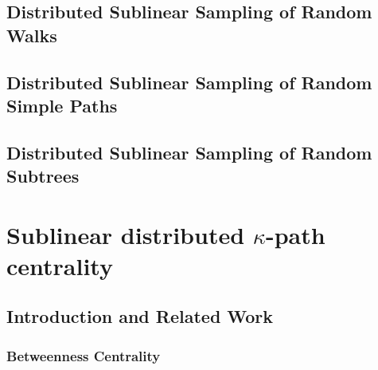 \documentclass{report}
\begin{document}
\section{Distributed Sublinear Sampling of Random Walks}
 \label{walks:sec:walks}


\section{Distributed Sublinear Sampling of Random Simple Paths}
 \label{walks:sec:paths}


\section{Distributed Sublinear Sampling of Random Subtrees}
 \label{walks:sec:trees}




\chapter{Sublinear distributed $\kappa$-path centrality}
 \label{chap:kpath}


\section{Introduction and Related Work}
 \label{kpath:sec:intro}

\subsection{Betweenness Centrality} \label{sec:bc}
\end{document}
